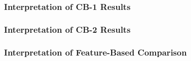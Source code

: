 \subsubsection{Interpretation of CB-1 Results}
\label{section:6.3.1}


\subsubsection{Interpretation of CB-2 Results}
\label{section:6.3.2}


\subsubsection{Interpretation of Feature-Based Comparison}
\label{section:6.3.3}

